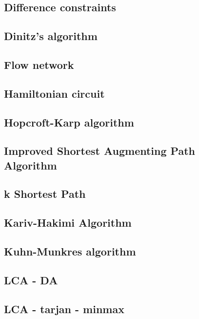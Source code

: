 \documentclass[a4paper,5pt,twocolumn,titlepage]{article}
\begin{document}
\subsection{Difference constraints}

\subsection{Dinitz's algorithm}

\subsection{Flow network}

\subsection{Hamiltonian circuit}

\subsection{Hopcroft-Karp algorithm}

\subsection{Improved Shortest Augmenting Path Algorithm}

\subsection{k Shortest Path}

\subsection{Kariv-Hakimi Algorithm}

\subsection{Kuhn-Munkres algorithm}

\subsection{LCA - DA}

\subsection{LCA - tarjan - minmax}

\end{document}
